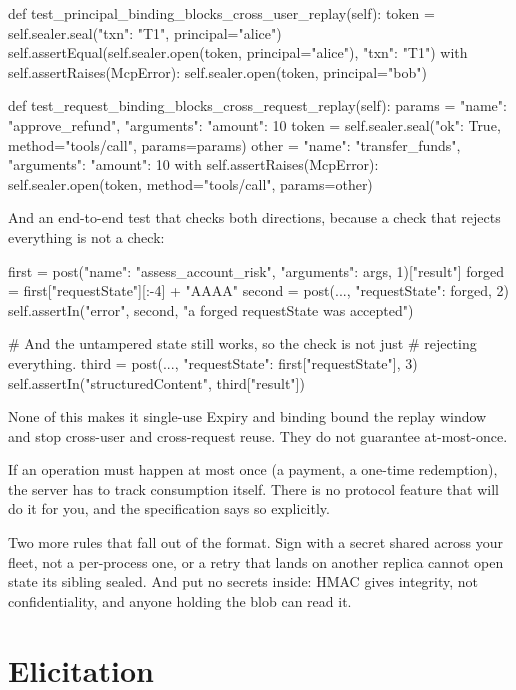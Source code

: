 \begin{py}
def test_principal_binding_blocks_cross_user_replay(self):
    token = self.sealer.seal({"txn": "T1"}, principal="alice")
    self.assertEqual(self.sealer.open(token, principal="alice"), {"txn": "T1"})
    with self.assertRaises(McpError):
        self.sealer.open(token, principal="bob")

def test_request_binding_blocks_cross_request_replay(self):
    params = {"name": "approve_refund", "arguments": {"amount": 10}}
    token = self.sealer.seal({"ok": True}, method="tools/call", params=params)
    other = {"name": "transfer_funds", "arguments": {"amount": 10}}
    with self.assertRaises(McpError):
        self.sealer.open(token, method="tools/call", params=other)
\end{py}

And an end-to-end test that checks both directions, because a check that rejects
everything is not a check:

\begin{py}
first = post({"name": "assess_account_risk", "arguments": args}, 1)["result"]
forged = first["requestState"][:-4] + "AAAA"
second = post({..., "requestState": forged}, 2)
self.assertIn("error", second, "a forged requestState was accepted")

# And the untampered state still works, so the check is not just
# rejecting everything.
third = post({..., "requestState": first["requestState"]}, 3)
self.assertIn("structuredContent", third["result"])
\end{py}

\begin{notebox}{None of this makes it single-use}
Expiry and binding bound the replay window and stop cross-user and
cross-request reuse. They do not guarantee at-most-once.

If an operation must happen at most once (a payment, a one-time redemption), the
server has to track consumption itself. There is no protocol feature that will
do it for you, and the specification says so explicitly.
\end{notebox}

Two more rules that fall out of the format. Sign with a secret shared across
your fleet, not a per-process one, or a retry that lands on another replica
cannot open state its sibling sealed. And put no secrets inside: HMAC gives
integrity, not confidentiality, and anyone holding the blob can read it.

\section{Elicitation}

